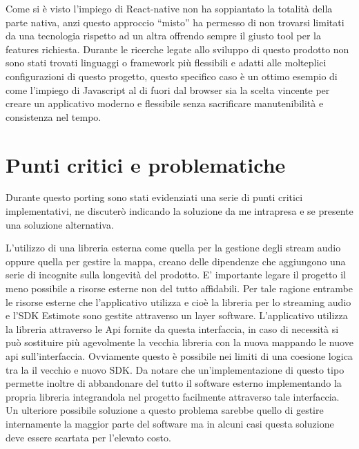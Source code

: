 Come si è visto l’impiego di React-native non ha soppiantato la totalità della parte nativa, anzi questo approccio “misto” ha permesso di non trovarsi limitati da una tecnologia rispetto ad un altra offrendo sempre il giusto tool per la features richiesta. Durante le ricerche legate allo sviluppo di questo prodotto non sono stati trovati linguaggi o framework più flessibili e adatti alle molteplici configurazioni di questo progetto, questo specifico caso è un ottimo esempio di come l’impiego di Javascript al di fuori dal browser sia la scelta vincente per creare un applicativo moderno e flessibile senza sacrificare manutenibilità e consistenza nel tempo.\vspace{5mm}

\section{Punti critici e problematiche}
Durante questo porting sono stati evidenziati una serie di punti critici implementativi, ne discuterò indicando la soluzione da me intrapresa e se presente una soluzione alternativa.\vspace{5mm}

L’utilizzo di una libreria esterna come quella per la gestione degli stream audio oppure quella per gestire la mappa, creano delle dipendenze che aggiungono una serie di incognite sulla longevità del prodotto. E’ importante legare il progetto il meno possibile a risorse esterne non del tutto affidabili. Per tale ragione entrambe le risorse esterne che l’applicativo utilizza e cioè la libreria per lo streaming audio e l’SDK Estimote sono gestite attraverso un layer software. L’applicativo utilizza la libreria attraverso le Api fornite da questa interfaccia, in caso di necessità si può sostituire più agevolmente la vecchia libreria con la nuova mappando le nuove api sull’interfaccia. Ovviamente questo è possibile nei limiti di una coesione logica tra la il vecchio e nuovo SDK. Da notare che un'implementazione di questo tipo permette inoltre di abbandonare del tutto il software esterno implementando la propria libreria integrandola nel progetto facilmente attraverso tale interfaccia. Un ulteriore possibile soluzione a questo problema sarebbe quello di gestire internamente la maggior parte del software ma in alcuni casi questa soluzione deve essere scartata per l’elevato costo.\vspace{5mm}


